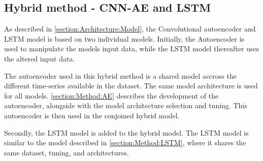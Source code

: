
\subsection{Hybrid method - CNN-AE and LSTM}



As described in \cref{section:Architecture:Model}, the Convolutional autoencoder and LSTM model
is based on two individual models.
Initially, the Autoencoder is used to manipulate the models input data,
while the LSTM model thereafter uses the altered input data.

The autoencoder used in this hybrid method is a shared model accross the different time-series
available in the dataset. The same model architecture is used for all models.
\cref{section:Method:AE} describes the development of the autoencoder, alongside with the model architecture selection and tuning.
This autoencoder is then used in the conjoined hybrid model.

Secondly, the LSTM model is added to the hybrid model.
The LSTM model is similar to the model described in \cref{section:Method:LSTM},
where it shares the same dataset, tuning, and architectures.













